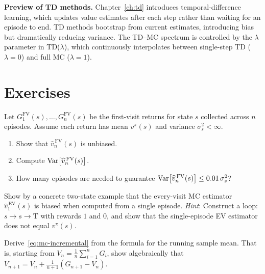 \textbf{Preview of TD methods.}  Chapter~\ref{ch:td} introduces temporal-difference learning, which updates value estimates after each step rather than waiting for an episode to end.  TD methods bootstrap from current estimates, introducing bias but dramatically reducing variance.  The TD--MC spectrum is controlled by the $\lambda$ parameter in TD($\lambda$), which continuously interpolates between single-step TD ($\lambda = 0$) and full MC ($\lambda = 1$).


\section*{Exercises}

\begin{exercise}
\label{ex:mc-fv-bias-variance}
Let $G_1^{\mathrm{FV}}(s), \dots, G_n^{\mathrm{FV}}(s)$ be the first-visit returns for state $s$ collected across $n$ episodes.  Assume each return has mean $v^\pi(s)$ and variance $\sigma_s^2 < \infty$.
\begin{enumerate}[label=(\alph*)]
  \item Show that $\widehat{v}_n^{\,\mathrm{FV}}(s)$ is unbiased.
  \item Compute $\operatorname{Var}\!\left[\widehat{v}_n^{\,\mathrm{FV}}(s)\right]$.
  \item How many episodes are needed to guarantee $\operatorname{Var}\!\left[\widehat{v}_n^{\,\mathrm{FV}}(s)\right] \le 0.01\,\sigma_s^2$?
\end{enumerate}
\end{exercise}

\begin{exercise}
\label{ex:mc-ev-bias}
Show by a concrete two-state example that the every-visit MC estimator $\widehat{v}_1^{\,\mathrm{EV}}(s)$ is biased when computed from a single episode.  \emph{Hint}: Construct a loop: $s \to s \to \mathrm{T}$ with rewards $1$ and $0$, and show that the single-episode EV estimator does not equal $v^\pi(s)$.
\end{exercise}

\begin{exercise}
\label{ex:mc-incremental}
Derive~\eqref{eq:mc-incremental} from the formula for the running sample mean.  That is, starting from $V_n = \frac{1}{n}\sum_{i=1}^n G_i$, show algebraically that $V_{n+1} = V_n + \frac{1}{n+1}(G_{n+1} - V_n)$.
\end{exercise}

